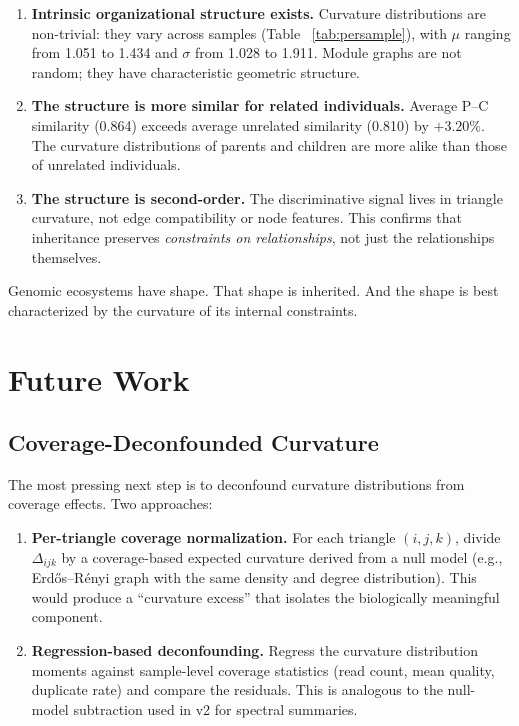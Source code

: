 \documentclass{../yalumba}
\begin{document}
\begin{enumerate}
  \item \textbf{Intrinsic organizational structure exists.}  Curvature
    distributions are non-trivial: they vary across samples (Table~%
    \ref{tab:persample}), with $\mu$ ranging from 1.051 to 1.434 and
    $\sigma$ from 1.028 to 1.911.  Module graphs are not random; they
    have characteristic geometric structure.

  \item \textbf{The structure is more similar for related individuals.}
    Average P--C similarity (0.864) exceeds average unrelated similarity
    (0.810) by $+3.20\%$.  The curvature distributions of parents and
    children are more alike than those of unrelated individuals.

  \item \textbf{The structure is second-order.}  The discriminative
    signal lives in triangle curvature, not edge compatibility or node
    features.  This confirms that inheritance preserves \emph{constraints
    on relationships}, not just the relationships themselves.
\end{enumerate}

\begin{pullquote}
Genomic ecosystems have shape.  That shape is inherited.  And the shape is
best characterized by the curvature of its internal constraints.
\end{pullquote}


\section{Future Work}
\label{sec:future}

\subsection{Coverage-Deconfounded Curvature}

The most pressing next step is to deconfound curvature distributions from
coverage effects.  Two approaches:

\begin{enumerate}
  \item \textbf{Per-triangle coverage normalization.}  For each triangle
    $(i,j,k)$, divide $\Delta_{ijk}$ by a coverage-based expected curvature
    derived from a null model (e.g., Erd\H{o}s--R\'{e}nyi graph with the
    same density and degree distribution).  This would produce a
    ``curvature excess'' that isolates the biologically meaningful component.

  \item \textbf{Regression-based deconfounding.}  Regress the curvature
    distribution moments against sample-level coverage statistics (read
    count, mean quality, duplicate rate) and compare the residuals.  This
    is analogous to the null-model subtraction used in v2 for spectral
    summaries.
\end{enumerate}
\end{document}
